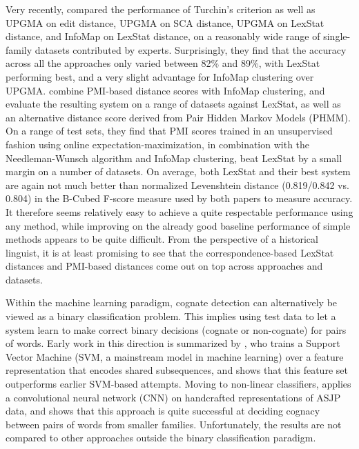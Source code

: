 Very recently, \cite{list_ea_2017} compared the performance of Turchin's criterion as well as UPGMA on edit distance, UPGMA on SCA distance, UPGMA on LexStat distance, and InfoMap on LexStat distance, on a reasonably wide range of single-family datasets contributed by experts. Surprisingly, they find that the accuracy across all the approaches only varied between 82\% and 89\%, with LexStat performing best, and a very slight advantage for InfoMap clustering over UPGMA. \cite{rama_ea_2017} combine PMI-based distance scores with InfoMap clustering, and evaluate the resulting system on a range of datasets against LexStat, as well as an alternative distance score derived from Pair Hidden Markov Models (PHMM). On a range of test sets, they find that PMI scores trained in an unsupervised fashion using online expectation-maximization, in combination with the Needleman-Wunsch algorithm and InfoMap clustering, beat LexStat by a small margin on a number of datasets. On average, both LexStat and their best system are 
again not much better than normalized Levenshtein distance (0.819/0.842 vs. 0.804) in the B-Cubed F-score measure used by both papers to measure accuracy. It therefore seems relatively easy to achieve a quite respectable performance using any method, while improving on the already good baseline performance of simple methods appears to be quite difficult. From the perspective of a historical linguist, it is at least promising to see that the correspondence-based LexStat distances and PMI-based distances come out on top across approaches and datasets.

Within the machine learning paradigm, cognate detection can alternatively be viewed as a binary classification problem. This implies using test data to let a system learn to make correct binary decisions (cognate or non-cognate) for pairs of words. Early work in this direction is summarized by \cite{rama2015}, who trains a Support Vector Machine (SVM, a mainstream model in machine learning) over a feature representation that encodes shared subsequences, and shows that this feature set outperforms earlier SVM-based attempts. Moving to non-linear classifiers, \cite{rama2016} applies a convolutional neural network (CNN) on handcrafted representations of ASJP data, and shows that this approach is quite successful at deciding cognacy between pairs of words from smaller families. Unfortunately, the results are not compared to other approaches outside the binary classification paradigm.

